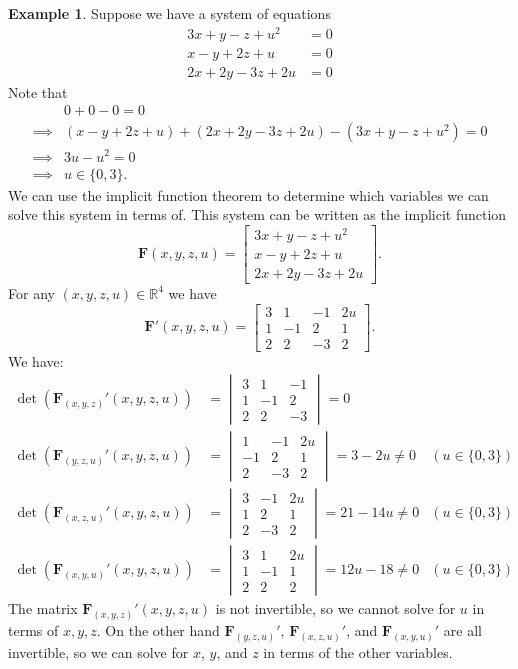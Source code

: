 \documentclass{article}
\newcommand{\R}{\mathbb{R}}
\newcommand{\x}{\mathbf{x}}
\newcommand{\F}{\mathbf{F}}
\theoremstyle{definition}
\newtheorem{example}{Example}[section]
\begin{document}
\begin{example}
	Suppose we have a system of equations 
	\begin{align*}
		3x+y-z+u^2&=0\\x-y+2z+u&=0\\2x+2y-3z+2u&=0
	\end{align*}
Note that 
\begin{align*}
	&0+0-0 = 0\\\implies & (x-y+2z+u) + (2x+2y-3z+2u)-(	3x+y-z+u^2)=0\\
	\implies & 3u-u^2= 0\\
	\implies &u\in\{0,3\}.
\end{align*}
We can use the implicit function theorem to determine which variables we can solve this system in terms of. This system can be written as the implicit function 
$$ \mathbf F(x,y,z,u)=\begin{bmatrix}
	3x+y-z+u^2\\
	x-y+2z+u\\
	2x+2y-3z+2u
\end{bmatrix}.$$
For any $ (x,y,z,u)\in\R^4 $ we have 
$$ \F'(x,y,z,u)=\begin{bmatrix}
	3&1&-1&2u\\1&-1&2&1\\2&2&-3&2
\end{bmatrix}.$$
We have:
\begin{align*}
	 \det \left(\F_{(x,y,z)}'(x,y,z,u)\right) &= \begin{vmatrix}
	 	3 & 1 & -1 \\
	 	1 & -1 & 2 \\
	 	2 & 2 & -3
	 \end{vmatrix} = 0\\
  \det \left(\F_{(y,z,u)}'(x,y,z,u)\right) &= \begin{vmatrix}
 	1 & -1 & 2u \\
 	-1 & 2 & 1 \\
 	2 & -3 & 2
 \end{vmatrix} = 3-2u\neq 0 &\left(u\in\{0,3\}\right) \\
 \det \left(\F_{(x,z,u)}'(x,y,z,u)\right) &= \begin{vmatrix}
	3 & -1 & 2u \\
	1 & 2 & 1 \\
	2 & -3 & 2
\end{vmatrix} = 21- 14u \neq 0&\left(u\in\{0,3\}\right) \\
 \det \left(\F_{(x,y,u)}'(x,y,z,u)\right) &= \begin{vmatrix}
	3 & 1 & 2u \\
	1 & -1 & 1 \\
	2 & 2 & 2
\end{vmatrix} = 12u- 18 \neq 0&\left(u\in\{0,3\}\right) 
\end{align*}
The matrix $ \F_{(x,y,z)}'(x,y,z,u)$ is not invertible, so we cannot solve for $ u $ in terms of $ x,y,z $. On the other hand $ \F_{(y,z,u)}' $, $  \F_{(x,z,u)}'$, and $ \F_{(x,y,u)}' $ are all invertible, so we can solve for $ x $, $ y $, and $ z $ in terms of the other variables. 
\end{example}
\end{document}

